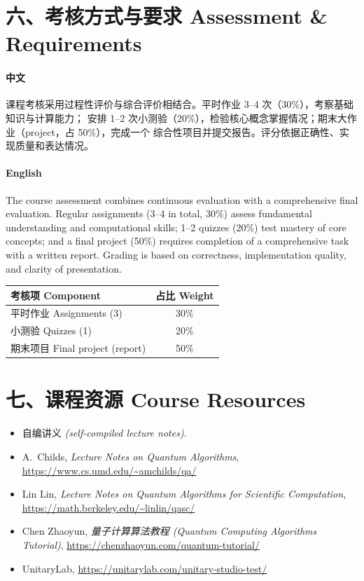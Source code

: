 \documentclass[UTF8,11pt]{ctexart}
\begin{document}
\section*{六、考核方式与要求 \quad Assessment \& Requirements}

\paragraph{中文}
课程考核采用过程性评价与综合评价相结合。平时作业 3--4 次（30\%），考察基础知识与计算能力；
安排 1--2 次小测验（20\%），检验核心概念掌握情况；期末大作业（project，占 50\%），完成一个
综合性项目并提交报告。评分依据正确性、实现质量和表达情况。

\paragraph{English}
The course assessment combines continuous evaluation with a comprehensive final evaluation.
Regular assignments (3--4 in total, 30\%) assess fundamental understanding and computational
skills; 1--2 quizzes (20\%) test mastery of core concepts; and a final project (50\%) requires
completion of a comprehensive task with a written report. Grading is based on correctness,
implementation quality, and clarity of presentation.

\begin{center}
\begin{tabular}{@{}lc@{}}
\toprule
考核项 Component & 占比 Weight \\ \midrule
平时作业 Assignments (3) & 30\% \\
小测验 Quizzes (1) & 20\% \\
期末项目 Final project (report) & 50\% \\ \bottomrule
\end{tabular}
\end{center}

\section*{七、课程资源 \quad Course Resources}
\begin{itemize}[leftmargin=1.6em,itemsep=1pt]
  \item 自编讲义 \textit{(self-compiled lecture notes)}.
  \item A.~Childs, \emph{Lecture Notes on Quantum Algorithms}, \url{https://www.cs.umd.edu/~amchilds/qa/}
  \item Lin Lin, \emph{Lecture Notes on Quantum Algorithms for Scientific Computation},
        \url{https://math.berkeley.edu/~linlin/qasc/}
  \item Chen Zhaoyun, \emph{量子计算算法教程 (Quantum Computing Algorithms Tutorial)},
        \url{https://chenzhaoyun.com/quantum-tutorial/}
  \item UnitaryLab, \url{https://unitarylab.com/unitary-studio-test/}
\end{itemize}
\end{document}
